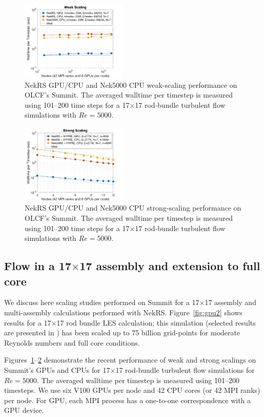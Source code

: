 \documentclass{anstrans}
\begin{document}
\begin{figure}[!ht]
\centering
\includegraphics[width=0.45\textwidth]{./Figures/nek_rod1717_weakscale_ideal.png}
\caption{NekRS GPU/CPU and Nek5000 CPU weak-scaling performance on OLCF's Summit.
The averaged walltime per timestep is measured using 101--200 time steps for
a 17$\times$17 rod-bundle turbulent flow simulations with $Re=5000$.}
\label{fig:nekrs1}
\end{figure}
\begin{figure}[!ht]
\centering
\includegraphics[width=0.45\textwidth]{./Figures/nek_rod1717_strongscale_ideal.png}
\caption{NekRS GPU/CPU and Nek5000 CPU strong-scaling performance on OLCF's Summit.
The averaged walltime per timestep is measured using 101--200 time steps for
a 17$\times$17 rod-bundle turbulent flow simulations with $Re=5000$.}
\label{fig:nekrs2}
\end{figure}


\subsection{Flow in a 17$\times$17 assembly and extension to full core}

We discuss here scaling studies performed on Summit for a 17$\times$17 assembly
and multi-assembly calculations performed with NekRS. Figure~\ref{fig:gpu2}
shows results for a 17$\times$17 rod bundle LES calculation; this simulation (selected
results are presented in \cite{merzari2020}) has been scaled up to 75 billion
grid-points for moderate Reynolds numbers and full core conditions.

\medskip
Figures~\ref{fig:nekrs1}--\ref{fig:nekrs2} demonstrate 
the recent performance of weak and strong scalings on Summit's GPUs 
and CPUs for 17$\times$17 rod-bundle turbulent flow simulations for $Re=5000$.
The averaged walltime per timestep is measured using 101–200 timesteps. 
We use six V100 GPUs per node and 42 CPU cores (or 42 MPI ranks) per node.
For GPU, each MPI process has a one-to-one correspondence with a GPU device. 
\end{document}
